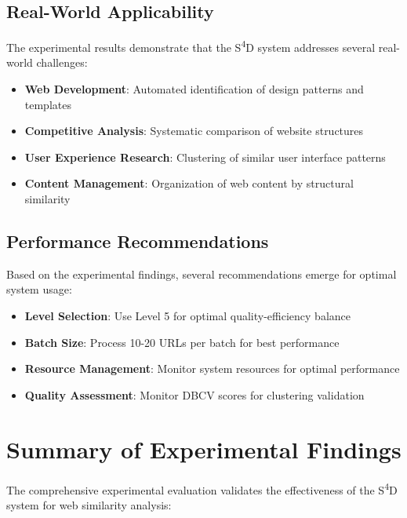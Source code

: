 \subsection{Real-World Applicability}
\label{subsec:real-world-applicability}

The experimental results demonstrate that the S\textsuperscript{4}D system addresses several real-world challenges:

\begin{itemize}
    \item \textbf{Web Development}: Automated identification of design patterns and templates
\item \textbf{Competitive Analysis}: Systematic comparison of website structures
\item \textbf{User Experience Research}: Clustering of similar user interface patterns
\item \textbf{Content Management}: Organization of web content by structural similarity
\end{itemize}

\subsection{Performance Recommendations}
\label{subsec:performance-recommendations}

Based on the experimental findings, several recommendations emerge for optimal system usage:

\begin{itemize}
    \item \textbf{Level Selection}: Use Level 5 for optimal quality-efficiency balance
    \item \textbf{Batch Size}: Process 10-20 URLs per batch for best performance
    \item \textbf{Resource Management}: Monitor system resources for optimal performance
    \item \textbf{Quality Assessment}: Monitor DBCV scores for clustering validation
\end{itemize}

\section{Summary of Experimental Findings}
\label{sec:experimental-summary}

The comprehensive experimental evaluation validates the effectiveness of the S\textsuperscript{4}D system for web similarity analysis:

